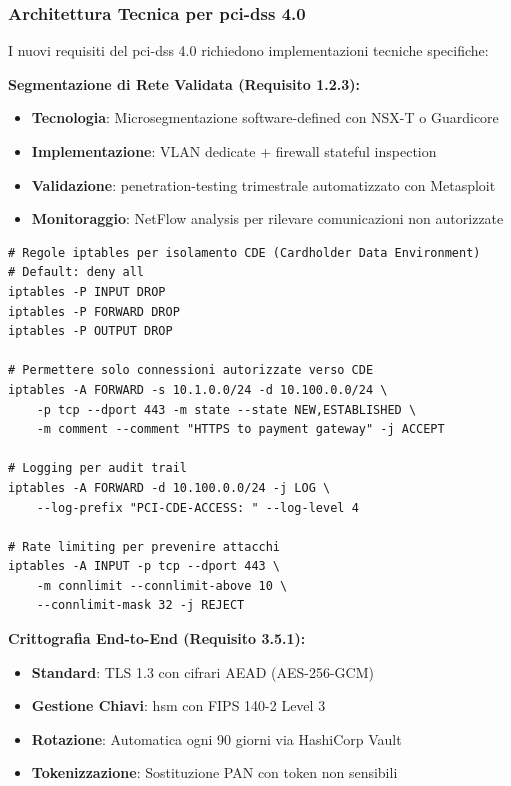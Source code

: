 \subsubsection{\texorpdfstring{Architettura Tecnica per \gls{pci-dss} 4.0}{4.2.1.1 - Architettura Tecnica per PCI-DSS 4.0}}

I nuovi requisiti del \gls{pci-dss} 4.0 richiedono implementazioni tecniche specifiche:

\textbf{Segmentazione di Rete Validata (Requisito 1.2.3):}
\begin{itemize}
    \item \textbf{Tecnologia}: Microsegmentazione software-defined con NSX-T o Guardicore
    \item \textbf{Implementazione}: VLAN dedicate + firewall stateful inspection
    \item \textbf{Validazione}: \gls{penetration-testing} trimestrale automatizzato con Metasploit
    \item \textbf{Monitoraggio}: NetFlow analysis per rilevare comunicazioni non autorizzate
\end{itemize}

\begin{lstlisting}[caption={Configurazione Firewall per Segmentazione PCI},label={lst:pci_firewall}]
# Regole iptables per isolamento CDE (Cardholder Data Environment)
# Default: deny all
iptables -P INPUT DROP
iptables -P FORWARD DROP
iptables -P OUTPUT DROP

# Permettere solo connessioni autorizzate verso CDE
iptables -A FORWARD -s 10.1.0.0/24 -d 10.100.0.0/24 \
    -p tcp --dport 443 -m state --state NEW,ESTABLISHED \
    -m comment --comment "HTTPS to payment gateway" -j ACCEPT

# Logging per audit trail
iptables -A FORWARD -d 10.100.0.0/24 -j LOG \
    --log-prefix "PCI-CDE-ACCESS: " --log-level 4

# Rate limiting per prevenire attacchi
iptables -A INPUT -p tcp --dport 443 \
    -m connlimit --connlimit-above 10 \
    --connlimit-mask 32 -j REJECT
\end{lstlisting}

\textbf{Crittografia End-to-End (Requisito 3.5.1):}
\begin{itemize}
    \item \textbf{Standard}: TLS 1.3 con cifrari AEAD (AES-256-GCM)
    \item \textbf{Gestione Chiavi}: \gls{hsm} con FIPS 140-2 Level 3
    \item \textbf{Rotazione}: Automatica ogni 90 giorni via HashiCorp Vault
    \item \textbf{Tokenizzazione}: Sostituzione PAN con token non sensibili
\end{itemize}

